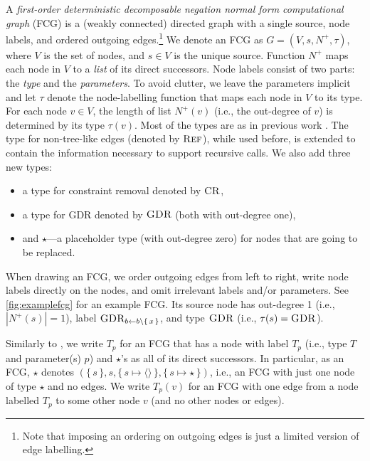 
A \emph{first-order deterministic decomposable negation normal form
  computational graph} (FCG) is a (weakly connected) directed graph with a
single source, node labels, and ordered outgoing edges.\footnote{Note that
  imposing an ordering on outgoing edges is just a limited version of edge
  labelling.} We denote an FCG as $G = (V, s, N^+, \tau)$, where $V$ is the set
of nodes, and $s \in V$ is the unique source. Function $N^+$ maps each node in
$V$ to a \emph{list} of its direct successors. Node labels consist of two parts:
the \emph{type} and the \emph{parameters}. To avoid clutter, we leave the
parameters implicit and let $\tau$ denote the node-labelling function that maps
each node in $V$ to its type. For each node $v \in V$, the length of list
$N^+(v)$ (i.e., the out-degree of $v$) is determined by its type $\tau(v)$. Most
of the types are as in previous work
\citep{DBLP:conf/nips/Broeck11,DBLP:conf/ijcai/BroeckTMDR11}. The type for
non-tree-like edges (denoted by $\operatorname{\textsc{Ref}}$), while used before, is extended to
contain the information necessary to support recursive calls. We also add three
new types:
\begin{itemize}
  \item a type for constraint removal denoted by $\operatorname{\textsc{CR}}$,
  \item a type for GDR denoted by $\operatorname{\textsc{GDR}}$ (both with out-degree one),
  \item and $\star$---a placeholder type (with out-degree zero) for nodes that
        are going to be replaced.
\end{itemize}
When drawing an FCG, we order outgoing edges from left to right, write node
labels directly on the nodes, and omit irrelevant labels and/or parameters. See
\cref{fig:examplefcg} for an example FCG\@. Its source node has out-degree 1
(i.e., $|N^+(s)| = 1$), label $\operatorname{\textsc{GDR}}_{b \gets b \setminus \{\, x \,\}}$, and type
$\operatorname{\textsc{GDR}}$ (i.e., $\tau(s) = \operatorname{\textsc{GDR}}$).

Similarly to \citet{DBLP:conf/ijcai/BroeckTMDR11}, we write $T_p$ for an FCG
that has a node with label $T_p$ (i.e., type $T$ and parameter(s) $p$) and
$\star$'s as all of its direct successors. In particular, as an FCG, $\star$
denotes
$(\{\, s \,\}, s, \{\, s \mapsto \langle\rangle \,\}, \{\, s \mapsto \star \,\})$,
i.e., an FCG with just one node of type $\star$ and no edges. We write $T_p(v)$
for an FCG with one edge from a node labelled $T_{p}$ to some other node $v$
(and no other nodes or edges).

